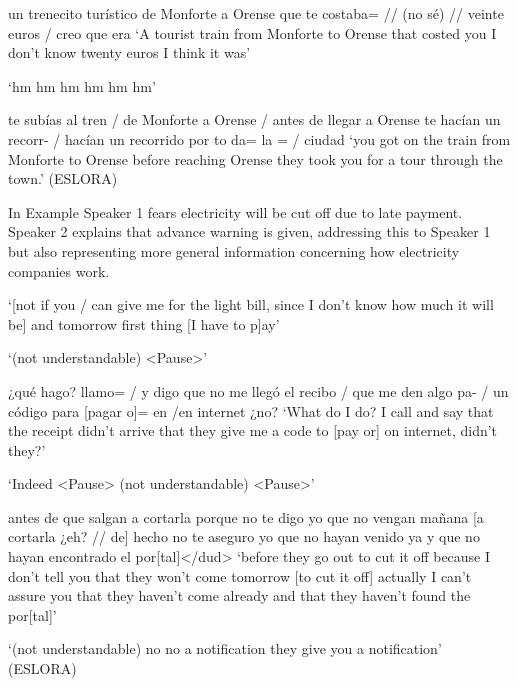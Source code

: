 \documentclass[output=paper]{langscibook}
\begin{document}
\ea\label{ex:pierre:22}
\begin{xlist}[Speaker 2]
 un trenecito turístico de Monforte a Orense que te costaba= // (no sé) // veinte euros / creo que era
 ‘A tourist train from Monforte to Orense that costed you I don’t know twenty euros I think it was’ 


 ‘hm hm hm hm hm hm’ 

 te subías al tren / {}{ {de Monforte a Orense / antes de llegar a Orense te hacían un recorr- / hacían un recorrido por to da= la = / ciudad} }
 ‘you got on the train {  } {from Monforte to Orense before reaching Orense they took you for a tour through the town.’ (ESLORA)}
\end{xlist}
\z 

In Example  Speaker 1 fears electricity will be cut off due to late payment. Speaker 2 explains that advance warning is given, addressing this to Speaker 1 but also representing more general information concerning how electricity companies work. 

\ea\label{ex:pierre:23}
\begin{xlist}[Speaker 2]
 ‘[not if you / can give me for the light bill, since I don’t know how much it will be] and tomorrow first thing [I have to p]ay’

 ‘(not understandable)  <Pause>’

 ¿qué hago? llamo= / y digo que no me llegó el recibo / que me den algo pa- / un código para [pagar o]= en /en internet ¿no? 
 ‘What do I do? I call and say that the receipt didn’t arrive that they give me a code to [pay or] on internet, didn't they?’ 

 ‘Indeed <Pause> (not understandable) <Pause>’

 antes de que salgan a cortarla porque no te digo yo que no vengan mañana [a cortarla ¿eh? // de] hecho no te aseguro yo que no hayan venido ya y que no hayan encontrado el por[tal]</dud> 
 ‘before they go out to cut it off because I don’t tell you that they won't come tomorrow [to cut it off] actually I can’t assure you that they haven’t come already and that they haven’t found the por[tal]’ 


 ‘(not understandable) no no      a notification they give you a notification’ (ESLORA)
\end{xlist}
\z 
\end{document}
